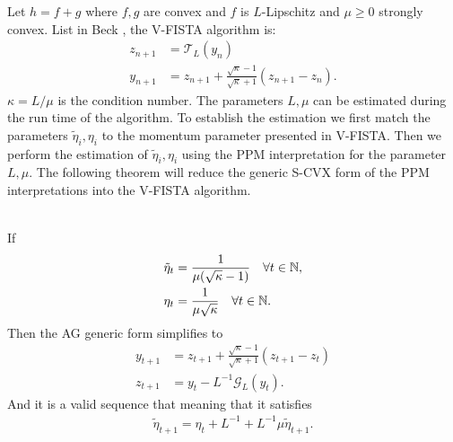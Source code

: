 \documentclass[12pt]{article}
\begin{document}
        \par
        Let $h = f + g$ where $f, g$ are convex and $f$ is $L$-Lipschitz and $\mu\ge 0$ strongly convex. 
        List in Beck \cite[(10.7.7)]{beck_first-order_nodate}, the V-FISTA algorithm is: 
        \begin{align*}
            z_{n + 1} &= \mathcal T_L(y_n)
            \\
            y_{n + 1} &= z_{n + 1} + \frac{\sqrt{\kappa} - 1}{\sqrt{\kappa} + 1}(z_{n + 1} - z_n). 
        \end{align*}
        $\kappa = L/\mu$ is the condition number. 
        The parameters $L, \mu$ can be estimated during the run time of the algorithm. 
        To establish the estimation we first match the parameters $\tilde \eta_i, \eta_i$ to the momentum parameter presented in V-FISTA. 
        Then we perform the estimation of $\tilde \eta_i, \eta_i$ using the PPM interpretation for the parameter $L, \mu$. 
        The following theorem will reduce the generic S-CVX form of the PPM interpretations into the V-FISTA algorithm. 
        \begin{theorem}
            \;\\
            If
            \begin{align*}
                \tilde \eta_t 
                &= \frac{1}{\mu(\sqrt{\kappa} - 1)}
                \quad \forall t \in \mathbb N, 
                \\
                \eta_t
                &= 
                \frac{1}{\mu\sqrt{\kappa}}
                \quad \forall t \in \mathbb N. 
            \end{align*}
            Then the AG generic form simplifies to 
            \begin{align*}
                y_{t + 1} &= z_{t + 1} + 
                \frac{\sqrt{\kappa} - 1}{\sqrt{\kappa} + 1}
                (z_{t +1} - z_t)
                \\
                z_{t + 1} 
                &= y_t - L^{-1}\mathcal G_L(y_t). 
            \end{align*}
            And it is a valid sequence that meaning that it satisfies 
            \begin{align*}
            \tilde \eta_{t + 1} = \eta_t + L^{-1} + L^{-1} \mu \tilde \eta_{t + 1}. 
            \end{align*}
        \end{theorem}
\end{document}
